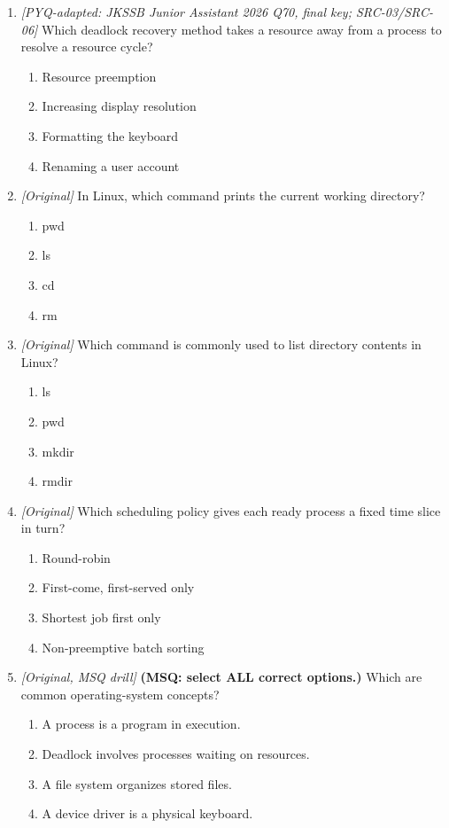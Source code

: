 \begin{enumerate}[label=\textbf{Q\arabic*.}, leftmargin=*]
\begin{enumerate}[label=\Alph*.]
    \item A process is a printed paper file.
  \end{enumerate}
\item \textit{[PYQ-adapted: JKSSB Junior Assistant 2026 Q70, final key; SRC-03/SRC-06]} Which deadlock recovery method takes a resource away from a process to resolve a resource cycle?
  \begin{enumerate}[label=\Alph*.]
\item Resource preemption
   \item Increasing display resolution
   \item Formatting the keyboard
   \item Renaming a user account
  \end{enumerate}

\item \textit{[Original]} In Linux, which command prints the current working directory?
  \begin{enumerate}[label=\Alph*.]
\item pwd
   \item ls
   \item cd
   \item rm
  \end{enumerate}

\item \textit{[Original]} Which command is commonly used to list directory contents in Linux?
  \begin{enumerate}[label=\Alph*.]
\item ls
   \item pwd
   \item mkdir
   \item rmdir
  \end{enumerate}

\item \textit{[Original]} Which scheduling policy gives each ready process a fixed time slice in turn?
  \begin{enumerate}[label=\Alph*.]
\item Round-robin
   \item First-come, first-served only
   \item Shortest job first only
   \item Non-preemptive batch sorting
  \end{enumerate}

\item \textit{[Original, MSQ drill]} \textbf{(MSQ: select ALL correct options.)} Which are common operating-system concepts?
  \begin{enumerate}[label=\Alph*.]
\item A process is a program in execution.
   \item Deadlock involves processes waiting on resources.
   \item A file system organizes stored files.
   \item A device driver is a physical keyboard.
  \end{enumerate}

\end{enumerate}
